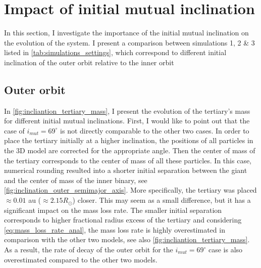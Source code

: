 \section{Impact of initial mutual inclination}\label{sec:inclination}


In this section, I investigate the importance of the initial mutual inclination on the evolution of the system. I present a comparison between simulations  1, 2 \& 3 listed in \cref{tab:simulations_settings}, which correspond to different initial inclination of the outer orbit relative to the inner orbit


\subsection{Outer orbit}

In \cref{fig:incliantion_tertiary_mass}, I present the evolution of the tertiary's mass for different initial mutual inclinations. First, I would like to point out that the case of $i_{mut} = 69^{\circ}$ is not directly comparable to the other two cases. In order to place the tertiary initially at a higher inclination, the positions of all particles in the 3D model are corrected for the appropriate angle. Then the center of mass of the tertiary corresponds to the center of mass of all these particles. In this case, numerical rounding resulted into a shorter initial separation between the giant and the center of mass of the inner binary, see \cref{fig:inclination_outer_semimajor_axis}. More specifically, the tertiary was placed $\approx 0.01$ au ($\approx 2.15 R_{\odot}$) closer. This may seem as a small difference, but it has a significant impact on the mass loss rate. The smaller initial separation corresponds to higher fractional radius excess of the tertiary and considering \cref{eq:mass_loss_rate_anal}, the mass loss rate is highly overestimated in comparison with the other two models, see also \cref{fig:incliantion_tertiary_mass}.  As a result, the rate of decay of the outer orbit for the $i_{mut} = 69^{\circ}$ case is also overestimated compared to the other two models.

